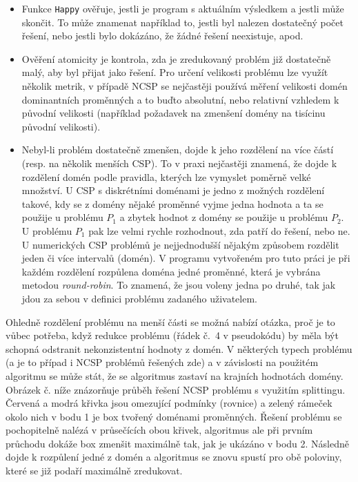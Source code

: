 \begin{itemize}
    \item Funkce \verb|Happy| ověřuje, jestli je program  s aktuálním výsledkem a jestli může skončit. To může znamenat například to, jestli byl nalezen dostatečný počet řešení, nebo jestli bylo dokázáno, že žádné řešení neexistuje, apod.
    \item Ověření atomicity je kontrola, zda je zredukovaný problém již dostatečně malý, aby byl přijat jako řešení. Pro určení velikosti problému lze využít několik metrik, v případě NCSP se nejčastěji používá měření velikosti domén dominantních proměnných a to buďto absolutní, nebo relativní vzhledem k původní velikosti (například požadavek na zmenšení domény na tisícinu původní velikosti).
    \item Nebyl-li problém dostatečně zmenšen, dojde k jeho rozdělení na více částí (resp. na několik menších CSP). To v praxi nejčastěji znamená, že dojde k rozdělení domén podle pravidla, kterých lze vymyslet poměrně velké množství. U CSP s diskrétními doménami je jedno z možných rozdělení takové, kdy se z domény nějaké proměnné vyjme jedna hodnota a ta se použije u problému $P_1$ a zbytek hodnot z domény se použije u problému $P_2$. U problému $P_1$ pak lze velmi rychle rozhodnout, zda patří do řešení, nebo ne. U numerických CSP problémů je nejjednodušší nějakým způsobem rozdělit jeden či více intervalů (domén). V programu vytvořeném pro tuto práci je při každém rozdělení rozpůlena doména jedné proměnné, která je vybrána metodou \emph{round-robin}. To znamená, že jsou voleny jedna po druhé, tak jak jdou za sebou v definici problému zadaného uživatelem.
\end{itemize}

Ohledně rozdělení problému na menší části se možná nabízí otázka, proč je to vůbec potřeba, když redukce problému (řádek č.~4 v pseudokódu) by měla být schopná odstranit nekonzistentní hodnoty z domén. V některých typech problému (a je to případ i NCSP problémů řešených zde)  a v závislosti na použitém algoritmu se může stát, že se algoritmus zastaví na krajních hodnotách domény. Obrázek č. níže znázorňuje průběh řešení NCSP problému s využitím splittingu. Červená a modrá křivka jsou omezující podmínky (rovnice) a zelený rámeček okolo nich v bodu 1 je box tvořený doménami proměnných. Řešení problému se pochopitelně nalézá v průsečících obou křivek, algoritmus ale při prvním průchodu dokáže box zmenšit maximálně tak, jak je ukázáno v bodu 2. Následně dojde k rozpůlení jedné z domén a algoritmus se znovu spustí pro obě poloviny, které se již podaří maximálně zredukovat.

